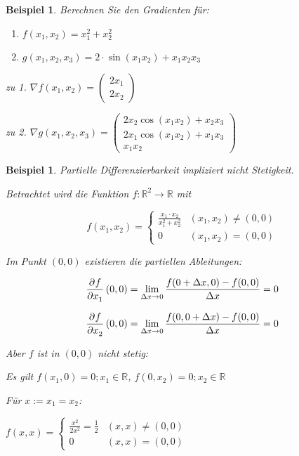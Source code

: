 \documentclass[fontset=ubuntu,12pt,a4paper]{scrreprt}
\newtheorem{beispiel}[defi]{Beispiel}
\begin{document}
\begin{beispiel}
    Berechnen Sie den Gradienten für:
    \begin{enumerate}
        \item \(f(x_1,x_2) = x_1^2 + x_2^2\)
        \item \(g(x_1,x_2,x_3) = 2 \cdot \sin(x_1 x_2) + x_1 x_2 x_3\)
    \end{enumerate}

    zu 1. \(\nabla f(x_1,x_2) = \begin{pmatrix}2x_1\\2x_2\end{pmatrix}\)
    
    zu 2. \(\nabla g(x_1,x_2,x_3) = \begin{pmatrix}2x_2 \cos(x_1 x_2)+x_2 x_3 \\ 2x_1 \cos(x_1 x_2)+x_1 x_3 \\ x_1 x_2\end{pmatrix}\)
\end{beispiel}

\begin{beispiel}
    Partielle Differenzierbarkeit impliziert nicht Stetigkeit.
    
    Betrachtet wird die Funktion \(f:\mathbb{R}^2\to\mathbb{R}\) mit
    
    \[f(x_1,x_2) = \begin{cases}
    \frac{x_1\cdot x_2}{x_1^2 + x_2^2} & (x_1,x_2) \ne (0,0) \\
    0 & (x_1,x_2) = (0,0)
    \end{cases}\]
    
    Im Punkt \((0,0)\) existieren die partiellen Ableitungen:
    
    \[\dpd{f}{x_1}(0,0) = \lim_{\Delta x\to0}{\frac{f(0+\Delta x,0)-f(0,0)}{\Delta x}} = 0\]
    
    \[\dpd{f}{x_2}(0,0) = \lim_{\Delta x\to0}{\frac{f(0,0+\Delta x)-f(0,0)}{\Delta x}} = 0\]
    
    Aber \(f\) ist in \((0,0)\) nicht stetig:
    
    Es gilt \(f(x_1,0) = 0; x_1 \in \mathbb{R}\), \(f(0,x_2) = 0; x_2 \in \mathbb{R}\)
    
    Für \(x := x_1 = x_2\):
    
    \(f(x,x)=\begin{cases}\frac{x^2}{2x^2}=\frac{1}{2} & (x,x) \ne (0,0) \\ 0 & (x,x) = (0,0)\end{cases}\)
\end{beispiel}
\end{document}
